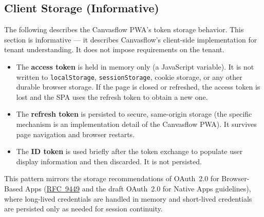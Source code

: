 \subsection{Client Storage (Informative)}

The following describes the Canvasflow PWA's token storage behavior. This section is
informative --- it describes Canvasflow's client-side implementation for tenant
understanding. It does not impose requirements on the tenant.

\begin{itemize}
  \item The \textbf{access token} is held in memory only (a JavaScript variable). It is
    not written to \texttt{localStorage}, \texttt{sessionStorage}, cookie storage, or
    any other durable browser storage. If the page is closed or refreshed, the access
    token is lost and the SPA uses the refresh token to obtain a new one.

  \item The \textbf{refresh token} is persisted to secure, same-origin storage (the
    specific mechanism is an implementation detail of the Canvasflow PWA). It survives
    page navigation and browser restarts.

  \item The \textbf{ID token} is used briefly after the token exchange to populate user
    display information and then discarded. It is not persisted.
\end{itemize}

This pattern mirrors the storage recommendations of OAuth~2.0 for Browser-Based Apps
(\href{https://tools.ietf.org/html/rfc9449}{RFC~9449} and the draft OAuth~2.0 for Native Apps guidelines), where long-lived
credentials are handled in memory and short-lived credentials are persisted only as
needed for session continuity.